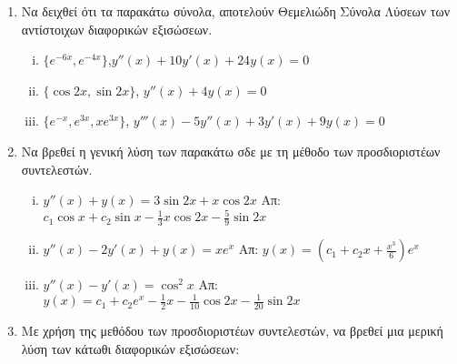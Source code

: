 



\everymath{\displaystyle}



\thispagestyle{empty}


\begin{center}
\end{center}

\vspace{\baselineskip}

\begin{enumerate}

	\item Να δειχθεί ότι τα  παρακάτω σύνολα, αποτελούν Θεμελιώδη Σύνολα Λύσεων των αντίστοιχων
		διαφορικών εξισώσεων.

		\begin{enumerate}[i)]
			\item $ \{ e^{-6x}, e^{-4x} \} $,\quad $ y''(x)+10y'(x)+24y(x)=0 $ 
			\item $ \{ \cos{2x}, \sin{2x} \}$, \quad $ y''(x)+4y(x)=0 $
			\item $ \{ e^{-x}, e^{3x}, xe^{3x} \} $, \quad $ y'''(x)-5y''(x)+3y'(x)+9y(x)=0 $
		\end{enumerate}

\item Να βρεθεί η γενική λύση των παρακάτω σδε με τη μέθοδο των προσδιοριστέων συντελεστών.

\begin{enumerate}[i)]
  \item $y''(x)+y(x)=3\sin 2x + x\cos 2x$ \hfill Απ: $c_{1}\cos x+c_{2}\sin x-\frac{1}{3}x\cos 2x-\frac{5}{9}\sin 2x $
  \item $y''(x)-2y'(x)+y(x)=xe^{x}$ \hfill Απ:  $y(x)=(c_{1}+c_{2}x+\frac{x^{3}}{6})e^{x}$
  \item $y''(x)-y'(x)=\cos^{2}x$ \hfill Απ: $y(x) =c_{1}+c_{2}e^{x}-\frac{1}{2}x-\frac{1}{10}\cos 2x- \frac{1}{20}\sin 2x$

\end{enumerate}

\item Με χρήση της μεθόδου των προσδιοριστέων συντελεστών, να βρεθεί μια μερική λύση των κάτωθι διαφορικών εξισώσεων:


\end{enumerate}
